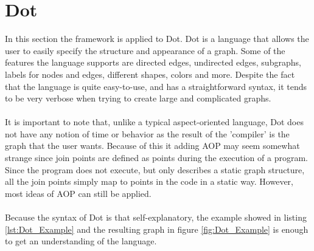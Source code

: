 \documentclass[a4paper]{report}
\begin{document}
\chapter{Dot}
\label{chap:Dot}
In this section the framework is applied to Dot. Dot is a language that allows the user to easily specify the structure and appearance of a graph. Some of the features the language supports  are directed edges, undirected edges, subgraphs, labels for nodes and edges, different shapes, colors and more. Despite the fact that the language is quite easy-to-use, and has a straightforward syntax, it tends to be very verbose when trying to create large and complicated graphs.\\
\\
It is important to note that, unlike a typical aspect-oriented language, Dot does not have any notion of time or behavior as the result of the 'compiler' is the graph that the user wants. Because of this it adding AOP may seem somewhat strange since join points are defined as points during the execution of a program. Since the program does not execute, but only describes a static graph structure, all the join points simply map to points in the code in a static way. However, most ideas of AOP can still be applied.\\
\\
Because the syntax of Dot is that self-explanatory, the example showed in listing \ref{lst:Dot_Example} and the resulting graph in figure \ref{fig:Dot_Example} is enough to get an understanding of the language.\\
\end{document}

